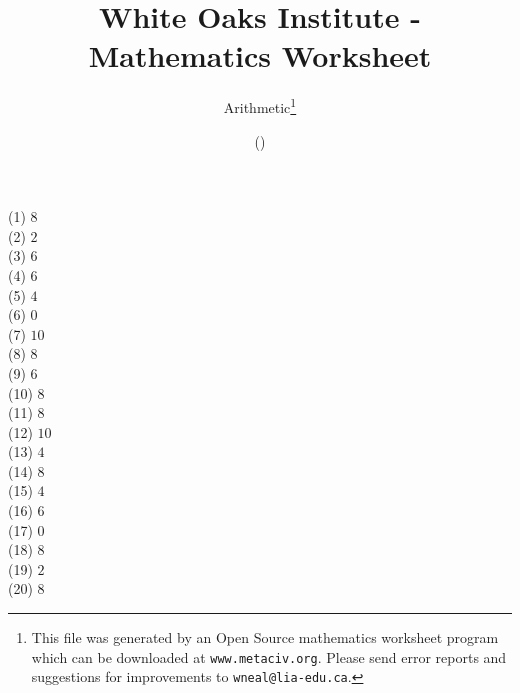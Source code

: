 \documentclass[letter]{article}
\begin{document}
\title{White Oaks Institute - Mathematics Worksheet}
\author{Arithmetic\thanks{This file was generated by an \textsf{Open Source} mathematics worksheet program which can be downloaded at \texttt{www.metaciv.org}. Please send error reports and suggestions for improvements to \texttt{wneal@lia-edu.ca}.}}
\date{\XCfileversion{} (\XCfiledate)}
\maketitle
\begin{multicols}{2}(1) $8$\\(2) $2$\\(3) $6$\\(4) $6$\\(5) $4$\\(6) $0$\\(7) $10$\\(8) $8$\\(9) $6$\\(10) $8$\\(11) $8$\\(12) $10$\\(13) $4$\\(14) $8$\\(15) $4$\\(16) $6$\\(17) $0$\\(18) $8$\\(19) $2$\\(20) $8$\end{multicols}
\end{document}

